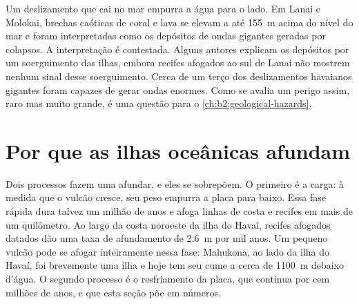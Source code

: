 \begin{omfigure}
\par{}
\end{omfigure}

Um deslizamento que cai no mar empurra a água para o lado. Em Lanai e Molokai, brechas caóticas
de coral e lava se elevam a até \qty{155}{m} acima do nível do mar e foram interpretadas como os depósitos de
ondas gigantes geradas por colapsos. A interpretação é contestada. Alguns autores explicam os depósitos por um
soerguimento das ilhas, embora recifes afogados ao sul de Lanai não mostrem nenhum sinal desse soerguimento.
Cerca de um terço dos deslizamentos havaianos gigantes foram  capazes de gerar ondas enormes. Como
se avalia um perigo assim, raro mas muito grande, é uma questão para o \cref{ch:b2:geological-hazards}.

\section{Por que as ilhas oceânicas afundam}\label{sec:b2:oceanic-islands:subsidence}

Dois processos fazem uma  afundar, e eles se sobrepõem. O primeiro é a carga: à medida que o vulcão
cresce, seu peso empurra a placa para baixo. Essa fase rápida dura talvez um milhão de anos e
afoga linhas de costa e recifes em mais de um quilômetro. Ao largo da costa noroeste da ilha do
Havaí, recifes afogados datados dão uma taxa de afundamento de \qty{2.6}{m} por mil anos. Um pequeno
vulcão pode se afogar inteiramente nessa fase: Mahukona, ao lado da ilha do Havaí, foi brevemente uma
ilha e hoje tem seu cume a cerca de \qty{1100}{m} debaixo d'água. O segundo processo é o
resfriamento da placa, que continua por cem milhões de anos, e que esta seção põe em
números.


